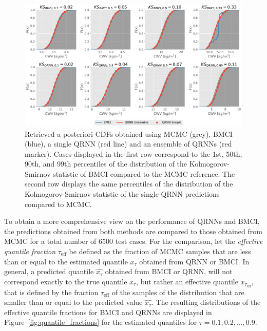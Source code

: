 \documentclass[journal abbreviation, manuscript]{copernicus}
\begin{document}
  \begin{figure}[hbpt!]
    \centering
    \includegraphics[width = 1.0\linewidth]{../plots/posterior_cdfs}
    \caption{Retrieved a posteriori CDFs obtained using MCMC (grey), BMCI
    (blue), a single QRNN (red line) and an ensemble of QRNNs (red marker). Cases
    displayed in the first row correspond to the 1st, 50th, 90th, and 99th
    percentiles of the distribution of the Kolmogorov-Smirnov statistic of BMCI
    compared to the MCMC reference. The second row displays the same percentiles of
    the distribution of the Kolmogorov-Smirnov statistic of the single QRNN
    predictions compared to MCMC.}
    \label{fig:cdfs}
  \end{figure}

    To obtain a more comprehensive view on the performance of QRNNs and BMCI,
the predictions obtained from both methods are compared to those obtained from
MCMC for a total number of 6500 test cases. For the comparison, let the
\textit{effective quantile fraction} $\tau_{\text{eff}}$ be defined as the
fraction of MCMC samples that are less than or equal to the estimated quantile
$x_\tau$ obtained from QRNN or BMCI. In general, a predicted quantile $\widehat{x_\tau}$
obtained from BMCI or QRNN, will not correspond exactly to the true
quantile $x_\tau$, but rather an effective quantile $x_{\tau_\text{eff}}$, that
is defined by the fraction $\tau_\text{eff}$ of the samples of the distribution
that are smaller than or equal to the predicted value $\widehat{x_\tau}$. The resulting
distributions of the effective quantile fractions for BMCI and QRNNs are
displayed in Figure~\ref{fig:quantile_fractions} for the estimated quantiles for
$\tau = 0.1, 0.2, \ldots, 0.9$.
\end{document}
